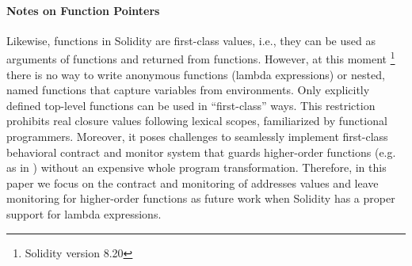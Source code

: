 \paragraph{Notes on Function Pointers}
Likewise, functions in Solidity are first-class values, i.e., they can be used
as arguments of functions and returned from functions.
However, at this moment \footnote{Solidity version 8.20} there is no way to
write anonymous functions (lambda expressions) or nested, named functions that
capture variables from environments.
Only explicitly defined top-level functions can be used in ``first-class'' ways.
This restriction prohibits real closure values following lexical scopes,
familiarized by functional programmers.
Moreover, it poses challenges to seamlessly implement first-class behavioral
contract and monitor system that guards higher-order functions (e.g. as in
\cite{DBLP:conf/icfp/FindlerF02}) without an expensive whole program
transformation.
Therefore, in this paper we focus on the contract and monitoring of addresses
values and leave monitoring for higher-order functions as future work when
Solidity has a proper support for lambda expressions.

\iffalse
	\begin{lstlisting}
function map(uint[] memory data, function (uint) pure returns (uint) f)
  internal pure returns (uint[] memory r)
{
  r = new uint[](data.length);
  for (uint i = 0; i < data.length; i++) {
    r[i] = f(data[i]);
  }
}
\end{lstlisting}

We can specify the contract for function arguments too:
\begin{lstlisting}
  # { f | {x | x < 0} -> {y | y > 0} }
  function map(int[] memory data, function (int) pure returns (int) f) { ... }
\end{lstlisting}
It might be too verbose -- so we can define those predicates separately for better readability/maintainability:
\begin{lstlisting}
  function greaterThanZero(int x) pure returns (bool) {
    return x > 0;
  }
  function smallerThanZero(int x) pure returns (bool) {
    return x < 0;
  }
  # { f | smallerThanZero -> greaterThanZero }
  function map(int[] memory data, function (int) pure returns (int) f) { ... }
\end{lstlisting}

Functions contracts can be higher-order --
it can take other function contracts
as part of the spec. For example
\zz{coooool!}
\begin{lstlisting}
  # TODO
  function f(function (function (int) returns (int) g) h) { ... }
\end{lstlisting}

Function contracts are first-class -- so if this guarded function is escaped
(e.g. by returning), the contract is still enforced:
\begin{lstlisting}
NEED AN EXAMPLE
\end{lstlisting}
\fi

